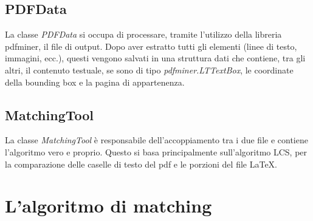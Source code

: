 	\subsection{PDFData}
		La classe \textit{PDFData} si occupa di processare, tramite l'utilizzo della libreria pdfminer, il file
		di output. Dopo aver estratto tutti gli elementi (linee di testo, immagini, ecc.), questi vengono salvati in una struttura dati
		che contiene, tra gli altri, il contenuto testuale, se sono di tipo \textit{pdfminer.LTTextBox}, le coordinate della bounding box e la pagina 
		di appartenenza.

	\subsection{MatchingTool}
		La classe \textit{MatchingTool} è responsabile dell'accoppiamento tra i due file e contiene l'algoritmo vero e proprio.
		Questo si basa principalmente sull'algoritmo LCS, per la comparazione delle caselle di testo del pdf e le porzioni del file LaTeX.

\section{L'algoritmo di matching}
	\subsection{}





